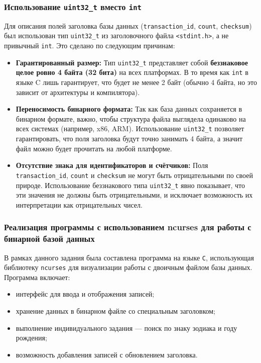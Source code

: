 \subsubsection*{Использование \texttt{uint32\_t} вместо \texttt{int}}

Для описания полей заголовка базы данных (\texttt{transaction\_id}, \texttt{count}, \texttt{checksum}) был использован тип \texttt{uint32\_t} из заголовочного файла \texttt{<stdint.h>}, а не привычный \texttt{int}. Это сделано по следующим причинам:

\begin{itemize}
  \item \textbf{Гарантированный размер:} 
  Тип \texttt{uint32\_t} представляет собой \textbf{беззнаковое целое ровно 4 байта (32 бита)} на всех платформах. В то время как \texttt{int} в языке C лишь гарантирует, что будет не менее 2 байт (обычно 4 байта, но это зависит от архитектуры и компилятора).

  \item \textbf{Переносимость бинарного формата:}
  Так как база данных сохраняется в бинарном формате, важно, чтобы структура файла выглядела одинаково на всех системах (например, x86, ARM). Использование \texttt{uint32\_t} позволяет гарантировать, что поля заголовка будут точно занимать 4 байта, а значит файл можно будет прочитать на любой платформе.

  \item \textbf{Отсутствие знака для идентификаторов и счётчиков:}
  Поля \texttt{transaction\_id}, \texttt{count} и \texttt{checksum} не могут быть отрицательными по своей природе. Использование беззнакового типа \texttt{uint32\_t} явно показывает, что эти значения не должны быть отрицательными, и исключает возможность их интерпретации как отрицательных чисел.
\end{itemize}

\subsubsection{Реализация программы с использованием ncurses для работы с бинарной базой данных}

В рамках данного задания была составлена программа на языке \texttt{C}, использующая библиотеку \texttt{ncurses} для визуализации работы с двоичным файлом базы данных. Программа включает:

\begin{itemize}
    \item интерфейс для ввода и отображения записей;
    \item хранение данных в бинарном файле со специальным заголовком;
    \item выполнение индивидуального задания --- поиск по знаку зодиака и году рождения;
    \item возможность добавления записей с обновлением заголовка.
\end{itemize}

